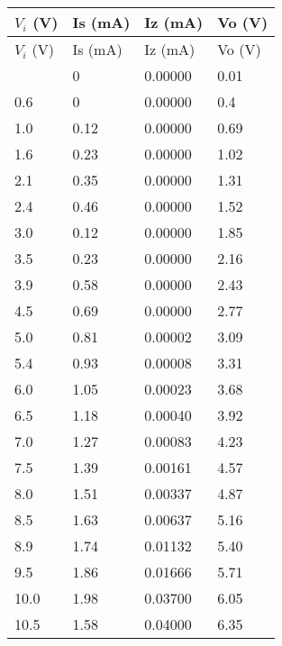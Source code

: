 \documentclass{scrartcl}
\begin{document}
\begin{longtable}{|l|l|l|l|}
        \hline
        $V_i$ (V) & Is (mA) & Iz (mA) & Vo (V) \\ \hline
        \endfirsthead
        \hline
        $V_i$ (V) & Is (mA) & Iz (mA) & Vo (V) \\ \hline
        \endhead
        \hline
        \endfoot
        \hline
        \endlastfoot
        0.0     & 0       & 0.00000       & 0.01    \\ \hline
        0.6    & 0       & 0.00000       & 0.4     \\ \hline
        1.0     & 0.12    & 0.00000      & 0.69    \\ \hline
        1.6    & 0.23    & 0.00000       & 1.02    \\ \hline
        2.1    & 0.35    & 0.00000      & 1.31    \\ \hline
        2.4    & 0.46    & 0.00000       & 1.52    \\ \hline
        3.0     & 0.12    & 0.00000       & 1.85    \\ \hline
        3.5    & 0.23    & 0.00000       & 2.16    \\ \hline
        3.9    & 0.58    & 0.00000      & 2.43    \\ \hline
        4.5    & 0.69    & 0.00000       & 2.77    \\ \hline
        5.0      & 0.81    & 0.00002       & 3.09    \\ \hline
        5.4    & 0.93    & 0.00008       & 3.31    \\ \hline
        6.0      & 1.05    & 0.00023       & 3.68    \\ \hline
        6.5    & 1.18    & 0.00040       & 3.92    \\ \hline
        7.0      & 1.27    & 0.00083       & 4.23    \\ \hline
        7.5    & 1.39    & 0.00161       & 4.57    \\ \hline
        8.0      & 1.51    & 0.00337       & 4.87    \\ \hline
        8.5    & 1.63    & 0.00637       & 5.16    \\ \hline
        8.9    & 1.74    & 0.01132       & 5.40    \\ \hline
        9.5    & 1.86    & 0.01666       & 5.71    \\ \hline
        10.0     & 1.98    & 0.03700       & 6.05    \\ \hline
        10.5   & 1.58    & 0.04000       & 6.35    \\ \hline

\end{longtable}
\end{document}
